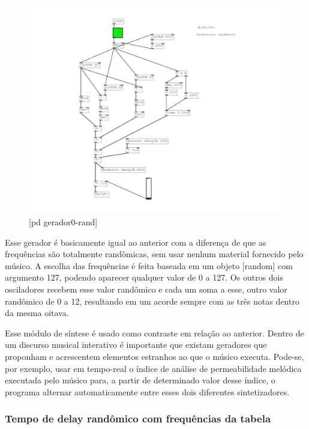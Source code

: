 \documentclass{ppgmus}
\begin{document}
\begin{figure}
\includegraphics[scale=.6]{gerador-sintese0-rand}
\caption{[pd gerador0-rand]}
\label{gerador0rand}
\end{figure}


Esse gerador é basicamente igual ao anterior com a diferença de que
as frequências são totalmente randômicas, sem usar nenhum material
fornecido pelo músico. A escolha das frequências é feita baseada em um
objeto [random] com argumento 127, podendo aparecer qualquer valor de 0 a 127.
Os outros dois osciladores recebem esse valor randômico e cada um soma a esse,
outro valor randômico de 0 a 12, resultando em um acorde sempre com as três
notas dentro da mesma oitava.

Esse módulo de síntese é usado como contraste em relação ao anterior.
Dentro de um discurso musical interativo é importante que existam geradores
que proponham e acrescentem elementos estranhos ao que o músico executa.
Pode-se, por exemplo, usar em tempo-real o índice de análise de permeabilidade 
melódica executada pelo músico para, a partir de determinado valor desse índice,
o programa alternar automaticamente entre esses dois diferentes sintetizadores.




\subsubsection{Tempo de delay randômico com frequências da tabela} 
\end{document}
